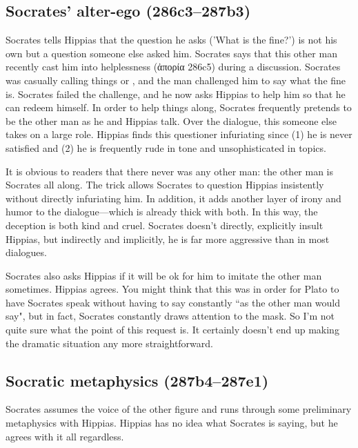 \documentclass[12pt]{article}
\begin{document}
\subsection{Socrates' alter-ego (286c3--287b3)}

Socrates tells Hippias that the question he asks ('What is the fine?') is not his own but a question someone else asked him.  Socrates says that this other man recently cast him into helplessness ({\g ἀπορία} 286c5) during a discussion.  Socrates was casually calling things  or , and the man challenged him to say what the fine is.  Socrates failed the challenge, and he now asks Hippias to help him so that he can redeem himself.  In order to help things along, Socrates frequently pretends to be the other man as he and Hippias talk.  Over the dialogue, this someone else takes on a large role.  Hippias finds this questioner infuriating since (1) he is never satisfied and (2) he is frequently rude in tone and unsophisticated in topics.

It is obvious to readers that there never was any other man: the other man is Socrates all along.  The trick allows Socrates to question Hippias insistently without directly infuriating him.  In addition, it adds another layer of irony and humor to the dialogue---which is already thick with both.  In this way, the deception is both kind and cruel.  Socrates doesn't directly, explicitly insult Hippias, but indirectly and implicitly, he is far more aggressive than in most dialogues.

Socrates also asks Hippias if it will be ok for him to imitate the other man sometimes.  Hippias agrees.  You might think that this was in order for Plato to have Socrates speak without having to say constantly ``as the other man would say", but in fact, Socrates constantly draws attention to the mask.  So I'm not quite sure what the point of this request is.  It certainly doesn't end up making the dramatic situation any more straightforward.


\subsection{Socratic metaphysics (287b4--287e1)}

Socrates assumes the voice of the other figure and runs through some preliminary metaphysics with Hippias.  Hippias has no idea what Socrates is saying, but he agrees with it all regardless.
\end{document}
